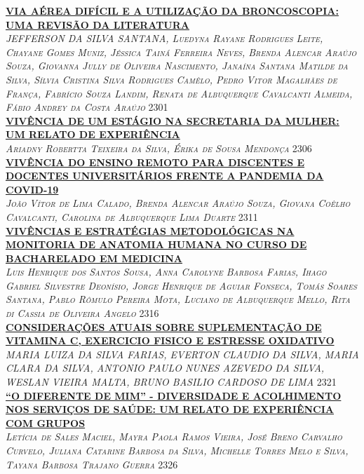 \noindent \textsc{\hyperlink{trabalhos/249691.pdf.1}{\textbf{VIA AÉREA DIFÍCIL E A UTILIZAÇÃO DA BRONCOSCOPIA: UMA REVISÃO DA LITERATURA}}}\\ 
\noindent \textsc{\textit{JEFFERSON DA SILVA SANTANA, Luedyna Rayane Rodrigues Leite, Chayane Gomes Muniz, Jéssica Tainá Ferreira Neves, Brenda Alencar Araújo Souza, Giovanna Jully de Oliveira Nascimento, Janaína Santana Matilde da Silva, Sílvia Cristina Silva Rodrigues Camêlo, Pedro Vitor Magalhães de França, Fabrício Souza Landim, Renata de Albuquerque Cavalcanti Almeida, Fábio Andrey da Costa Araújo}} \hfill 2301\\ 

\noindent \textsc{\hyperlink{trabalhos/249170.pdf.1}{\textbf{VIVÊNCIA DE UM ESTÁGIO NA SECRETARIA DA MULHER: UM RELATO DE EXPERIÊNCIA}}}\\ 
\noindent \textsc{\textit{Ariadny Robertta Teixeira da Silva, Érika de Sousa Mendonça}} \hfill 2306\\ 

\noindent \textsc{\hyperlink{trabalhos/250311.pdf.1}{\textbf{VIVÊNCIA DO ENSINO REMOTO PARA DISCENTES E DOCENTES UNIVERSITÁRIOS FRENTE A PANDEMIA DA COVID-19}}}\\ 
\noindent \textsc{\textit{João Vítor de Lima Calado, Brenda Alencar Araújo Souza, Giovana Coêlho Cavalcanti, Carolina de Albuquerque Lima Duarte}} \hfill 2311\\ 

\noindent \textsc{\hyperlink{trabalhos/251381.pdf.1}{\textbf{VIVÊNCIAS E ESTRATÉGIAS METODOLÓGICAS NA MONITORIA DE ANATOMIA HUMANA NO CURSO DE  BACHARELADO EM MEDICINA}}}\\ 
\noindent \textsc{\textit{Luis Henrique dos Santos Sousa, Anna Carolyne Barbosa Farias, Ihago Gabriel  Silvestre Deonísio, Jorge Henrique de Aguiar Fonseca, Tomás Soares Santana, Pablo Rômulo Pereira Mota, Luciano de Albuquerque Mello, Rita di Cassia de  Oliveira Angelo}} \hfill 2316\\ 

\noindent \textsc{\hyperlink{trabalhos/250330.pdf.1}{\textbf{CONSIDERAÇÕES ATUAIS SOBRE SUPLEMENTAÇÃO DE VITAMINA C, EXERCICIO FISICO E ESTRESSE OXIDATIVO }}}\\ 
\noindent \textsc{\textit{MARIA LUIZA DA SILVA FARIAS, EVERTON CLAUDIO DA SILVA, MARIA CLARA DA SILVA, ANTONIO PAULO NUNES AZEVEDO DA SILVA, WESLAN VIEIRA MALTA, BRUNO BASILIO CARDOSO DE LIMA}} \hfill 2321\\ 

\noindent \textsc{\hyperlink{trabalhos/249482.pdf.1}{\textbf{“O DIFERENTE DE MIM” - DIVERSIDADE E  ACOLHIMENTO NOS SERVIÇOS DE SAÚDE: UM RELATO DE  EXPERIÊNCIA COM GRUPOS}}}\\ 
\noindent \textsc{\textit{Letícia de Sales Maciel, Mayra Paola Ramos  Vieira, José Breno Carvalho Curvelo,  Juliana Catarine Barbosa da Silva, Michelle Torres Melo e Silva, Tayana Barbosa Trajano Guerra}} \hfill 2326\\ 



